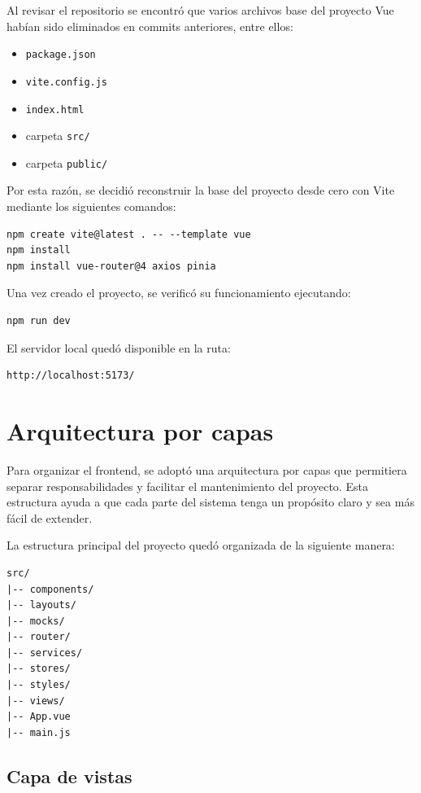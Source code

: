 \documentclass[12pt]{article}
\begin{document}
Al revisar el repositorio se encontró que varios archivos base del proyecto Vue habían sido eliminados en commits anteriores, entre ellos:

\begin{itemize}
    \item \texttt{package.json}
    \item \texttt{vite.config.js}
    \item \texttt{index.html}
    \item carpeta \texttt{src/}
    \item carpeta \texttt{public/}
\end{itemize}

Por esta razón, se decidió reconstruir la base del proyecto desde cero con Vite mediante los siguientes comandos:

\begin{verbatim}
npm create vite@latest . -- --template vue
npm install
npm install vue-router@4 axios pinia
\end{verbatim}

Una vez creado el proyecto, se verificó su funcionamiento ejecutando:

\begin{verbatim}
npm run dev
\end{verbatim}

El servidor local quedó disponible en la ruta:

\begin{verbatim}
http://localhost:5173/
\end{verbatim}

\section{Arquitectura por capas}

Para organizar el frontend, se adoptó una arquitectura por capas que permitiera separar responsabilidades y facilitar el mantenimiento del proyecto. Esta estructura ayuda a que cada parte del sistema tenga un propósito claro y sea más fácil de extender.

La estructura principal del proyecto quedó organizada de la siguiente manera:

\begin{verbatim}
src/
|-- components/
|-- layouts/
|-- mocks/
|-- router/
|-- services/
|-- stores/
|-- styles/
|-- views/
|-- App.vue
|-- main.js
\end{verbatim}

\subsection{Capa de vistas}
\end{document}
